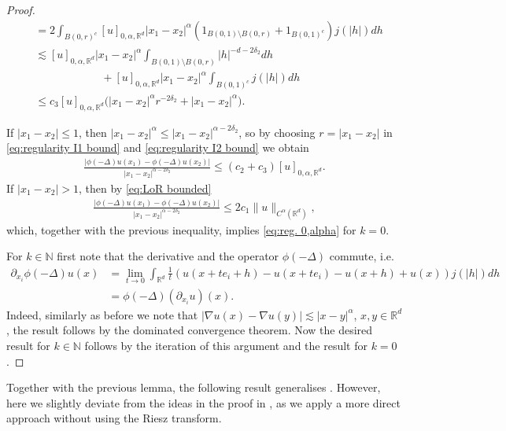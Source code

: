 \documentclass[12pt,a4paper,onecolumn]{amsart}
\theoremstyle{definition}
\newcommand{\R}{\mathbb{R}}
\newcommand{\N}{\mathbb{N}}
\newcommand{\1}{\mathbf 1}
\newcommand{\LoR}{\phi(-\Delta)}
\numberwithin{equation}{section}
\begin{document}
\begin{proof}
\begin{align}
        &=2\int_{B(0,r)^c} [u]_{0,\alpha,\R^d}|x_1-x_2|^\alpha (1_{B(0,1)\setminus B(0,r)}+1_{B(0,1)^c})j(|h|)dh\nonumber\\
        &\lesssim  [u]_{0,\alpha,\R^d}|x_1-x_2|^\alpha \int_{B(0,1)\setminus B(0,r)}|h|^{-d-2\delta_2}dh\nonumber\\&
        \hspace{6em}
        + [u]_{0,\alpha,\R^d}|x_1-x_2|^\alpha\int_{B(0,1)^c}j(|h|)dh\nonumber\\
        &\le c_3[u]_{0,\alpha,\R^d}\big(|x_1-x_2|^\alpha r^{-2\delta_2}+|x_1-x_2|^\alpha\big).\label{eq:regularity I2 bound}
    \end{align}
   
    
    If $|x_1-x_2|\le 1$, then $|x_1-x_2|^\alpha\le |x_1-x_2|^{\alpha-2\delta_2}$, so by choosing $r=|x_1-x_2|$ in \eqref{eq:regularity I1 bound} and \eqref{eq:regularity I2 bound} we obtain
    \begin{align*}
        \frac{|\LoR u(x_1)-\LoR u(x_2)|}{|x_1-x_2|^{\alpha-2\delta_2}}\le (c_2+c_3) [u]_{0,\alpha,\R^d}.
    \end{align*}
   If $|x_1-x_2|> 1$, then by \eqref{eq:LoR bounded} 
    \begin{align*}
        \frac{|\LoR u(x_1)-\LoR u(x_2)|}{|x_1-x_2|^{\alpha-2\delta_2}}\le  2c_1\|u\|_{C^\alpha(\R^d)},
    \end{align*}
 which, together with the previous inequality, implies \eqref{eq:reg. 0,alpha} for $k=0$.

For $k\in \N$ first note that the derivative and the operator $\LoR$ commute, i.e.
    \begin{align*}
        \partial_{x_i}\LoR u(x)&=\lim_{t\to 0}\int_{\R^d}\frac 1 t (u(x+te_i+h)-u(x+te_i)-u(x+h)+u(x))j(|h|)dh\\
        &= \LoR (\partial_{x_i}u)(x).
    \end{align*}
 Indeed, similarly as before
we note that $|\nabla u(x)-\nabla u(y)|\lesssim |x-y|^\alpha$, $x,y\in\R^d$, the result follows by the dominated convergence theorem. Now the desired result for $k\in \N$ follows by the iteration of this argument and the result for $k=0$. 
\end{proof}

Together with the previous lemma, the following result generalises \cite[Proposition 2.6]{Silvestre2007regularity}. However, here we slightly deviate from the ideas in the proof in \cite{Silvestre2007regularity}, as we apply a more direct approach without using the Riesz transform.
\end{document}
